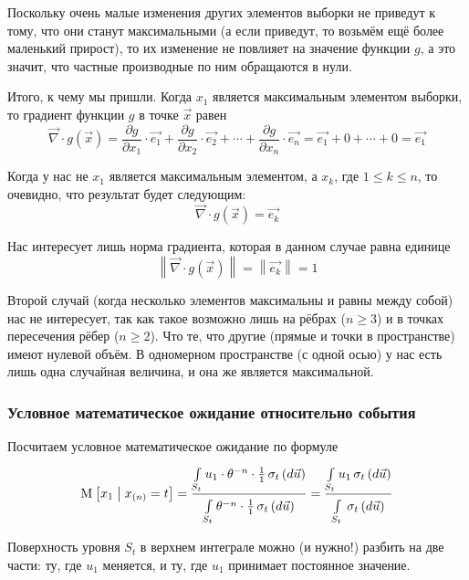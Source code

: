 Поскольку очень малые изменения других элементов выборки не приведут к тому,
что они станут максимальными (а если приведут, то возьмём ещё более
маленький прирост), то их изменение не повлияет на значение функции $g$,
а это значит, что частные производные по ним обращаются в нули.

Итого, к чему мы пришли.
Когда $x_1$ является максимальным элементом выборки,
то градиент функции $g$ в точке $\vec{x}$ равен
$$\vec{\nabla} \cdot g\left( \vec{x} \right)
  = \frac{\partial g}{\partial x_1} \cdot \vec{e_1}
      + \frac{\partial g}{\partial x_2} \cdot \vec{e_2}
      + \cdots
      + \frac{\partial g}{\partial x_n} \cdot \vec{e_n}
  = \vec{e_1} + 0 + \cdots + 0 = \vec{e_1}$$

Когда у нас не $x_1$ является максимальным элементом, а $x_k$,
где $1 \le k \le n$, то очевидно, что результат будет следующим:
$$\vec{\nabla} \cdot g\left( \vec{x} \right) = \vec{e_k}$$

Нас интересует лишь норма градиента, которая в данном случае равна единице
$$\left\| \vec{\nabla} \cdot g\left( \vec{x} \right) \right\|
  = \left\| \vec{e_k} \right\| = 1$$

Второй случай (когда несколько элементов максимальны и равны между собой)
нас не интересует, так как такое возможно лишь на рёбрах ($n \ge 3$) и в точках
пересечения рёбер ($n \ge 2$).
Что те, что другие (прямые и точки в пространстве) имеют нулевой объём.
В одномерном пространстве (с одной осью) у нас есть лишь одна
случайная величина, и она же является максимальной.

\subsubsection{Условное математическое ожидание относительно события}
Посчитаем условное математическое ожидание по формуле
\begin{align*}
  \Mean{x_1 \mcond x_{\left( n \right)} = t}
      = \frac{\integrall{S_t}{
    \sigma_{t}\left(d\vec{u} \right)}{
    u_1 \cdot \theta^{-n} \cdot \frac{1}{1}}}
      {\integrall{S_t}{\sigma_{t}\left(d\vec{u} \right)}{
    \theta^{-n} \cdot \frac{1}{1}}}
      = \frac{\integrall{S_t}{
    \sigma_{t}\left(d\vec{u} \right)}{u_1}}{
      \integrall{S_t}{
    \sigma_{t}\left(d\vec{u} \right)}{}}
\end{align*}

Поверхность уровня $S_t$ в верхнем интеграле можно (и нужно!)
разбить на две части: ту, где $u_1$ меняется, и ту, где $u_1$
принимает постоянное значение.

